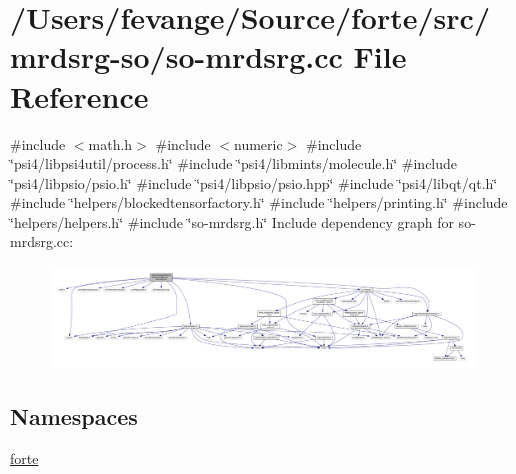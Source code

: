 \hypertarget{so-mrdsrg_8cc}{}\section{/\+Users/fevange/\+Source/forte/src/mrdsrg-\/so/so-\/mrdsrg.cc File Reference}
\label{so-mrdsrg_8cc}
{\ttfamily \#include $<$math.\+h$>$}\newline
{\ttfamily \#include $<$numeric$>$}\newline
{\ttfamily \#include \char`\"{}psi4/libpsi4util/process.\+h\char`\"{}}\newline
{\ttfamily \#include \char`\"{}psi4/libmints/molecule.\+h\char`\"{}}\newline
{\ttfamily \#include \char`\"{}psi4/libpsio/psio.\+h\char`\"{}}\newline
{\ttfamily \#include \char`\"{}psi4/libpsio/psio.\+hpp\char`\"{}}\newline
{\ttfamily \#include \char`\"{}psi4/libqt/qt.\+h\char`\"{}}\newline
{\ttfamily \#include \char`\"{}helpers/blockedtensorfactory.\+h\char`\"{}}\newline
{\ttfamily \#include \char`\"{}helpers/printing.\+h\char`\"{}}\newline
{\ttfamily \#include \char`\"{}helpers/helpers.\+h\char`\"{}}\newline
{\ttfamily \#include \char`\"{}so-\/mrdsrg.\+h\char`\"{}}\newline
Include dependency graph for so-\/mrdsrg.cc\+:
\nopagebreak
\begin{figure}[H]
\begin{center}
\leavevmode
\includegraphics[width=350pt]{so-mrdsrg_8cc__incl}
\end{center}
\end{figure}
\subsection*{Namespaces}
\begin{DoxyCompactItemize}
\item 
 \mbox{\hyperlink{namespaceforte}{forte}}
\end{DoxyCompactItemize}
